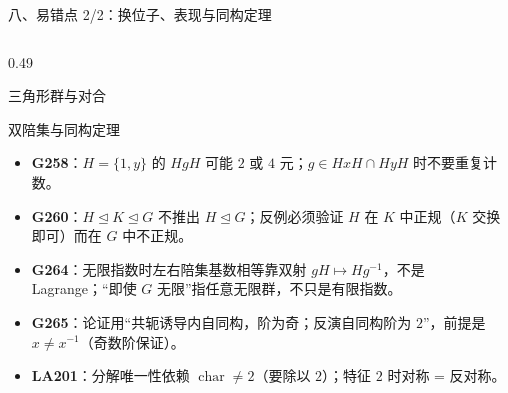 \documentclass[aspectratio=169,10pt,fontset=none]{ctexbeamer}
\newcommand{\ex}[1]{\textcolor{accent}{\footnotesize\bfseries #1}}
\begin{document}
\begin{frame}[t]{八、易错点 2/2：换位子、表现与同构定理}
\begin{columns}[T,onlytextwidth]
\begin{column}{0.49\textwidth}
\begin{alertblock}{\footnotesize 三角形群与对合}
\begin{itemize}
        \end{itemize}
      \end{alertblock}
      \begin{alertblock}{\footnotesize 双陪集与同构定理}
        \scriptsize
        \begin{itemize}\setlength{\itemsep}{1pt}
          \item \ex{G258}：$H=\{1,y\}$ 的 $HgH$ 可能 $2$ 或 $4$ 元；$g\in HxH\cap HyH$ 时不要重复计数。
          \item \ex{G260}：$H\trianglelefteq K\trianglelefteq G$ 不推出 $H\trianglelefteq G$；反例必须验证 $H$ 在 $K$ 中正规（$K$ 交换即可）而在 $G$ 中不正规。
          \item \ex{G264}：无限指数时左右陪集基数相等靠双射 $gH\mapsto Hg^{-1}$，不是 Lagrange；“即使 $G$ 无限”指任意无限群，不只是有限指数。
          \item \ex{G265}：论证用“共轭诱导内自同构，阶为奇；反演自同构阶为 $2$”，前提是 $x\ne x^{-1}$（奇数阶保证）。
          \item \ex{LA201}：分解唯一性依赖 $\operatorname{char}\ne2$（要除以 $2$）；特征 $2$ 时对称 = 反对称。
        \end{itemize}
      \end{alertblock}
    \end{column}
  \end{columns}
\end{frame}
\end{document}
